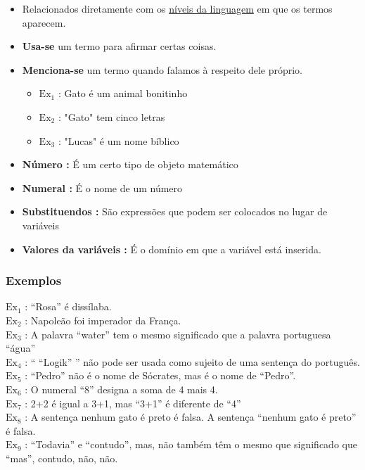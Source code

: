         \begin{itemize}[left=0.5cm, align=left, nosep]
            \item Relacionados diretamente com os \underline{níveis da linguagem} em que os termos aparecem.    
            \item \textbf{Usa-se} um termo para afirmar certas coisas.
            \item \textbf{Menciona-se} um termo quando falamos à respeito dele próprio.
            
            \begin{itemize}[left=0.5cm, nosep, label=$\hookrightarrow$]
                \item $\text{Ex}_1$ : Gato é um animal bonitinho
                \item $\text{Ex}_2$ : "Gato" tem cinco letras 
                \item $\text{Ex}_3$ : "Lucas" é um nome bíblico
            \end{itemize}
           
            \item \textbf{Número :} É um certo tipo de objeto matemático
            \item \textbf{Numeral :} É o nome de um número
            \item \textbf{Substituendos :} São expressões que podem ser colocados no lugar de variáveis
            \item \textbf{Valores da variáveis :} É o domínio em que a variável está inserida.

        \end{itemize}
    
        \subsubsection*{Exemplos}
            $\text{Ex}_1$ : “Rosa” é dissílaba. \\
            $\text{Ex}_2$ : Napoleão foi imperador da França. \\
            $\text{Ex}_3$ : A palavra “water” tem o mesmo significado que a palavra portuguesa “água” \\
            $\text{Ex}_4$ : “ “Logik” ” não pode ser usada como sujeito de uma sentença do português. \\
            $\text{Ex}_5$ : “Pedro” não é o nome de Sócrates, mas é o nome de “Pedro”. \\
            $\text{Ex}_6$ : O numeral “8” designa a soma de 4 mais 4. \\
            $\text{Ex}_7$ : 2+2 é igual a 3+1, mas “3+1” é diferente de “4” \\
            $\text{Ex}_8$ : A sentença nenhum gato é preto é falsa. A sentença “nenhum gato é preto” é falsa. \\
            $\text{Ex}_9$ : “Todavia” e “contudo”, mas, não também têm o mesmo que significado que “mas”, contudo, não, não. 
